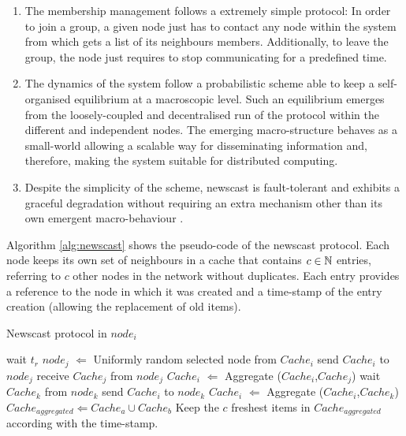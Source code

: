 \begin{enumerate}
\item The membership management follows a extremely simple protocol: In
      order to join a group, a given node just has to contact any node
      within the system from which gets a list of its neighbours
      members. Additionally, to leave the group, the node just requires
      to stop communicating for a predefined time.

\item The dynamics of the system follow a probabilistic scheme able to keep a self-organised equilibrium at a macroscopic level. Such an equilibrium emerges from the loosely-coupled and decentralised run of the protocol within the different and independent nodes. The emerging macro-structure behaves as a small-world \cite{wattsstrogatz} allowing a scalable way for disseminating information and, therefore, making the system suitable for distributed computing.

\item Despite the simplicity of the scheme, newscast is fault-tolerant and exhibits a graceful degradation without requiring an extra mechanism other than its own emergent macro-behaviour \cite{spyros:robustscalable}.
\end{enumerate}



Algorithm \ref{alg:newscast} shows the pseudo-code of the newscast protocol. Each node 
keeps its own set of neighbours in a cache that contains $c \in \mathbb{N}$ entries, referring to $c$ other nodes in the network without duplicates. Each entry provides a reference to the node in which it was created and a time-stamp of the entry creation (allowing the replacement of old items).



\begin{algorithm}
\caption{Newscast protocol in $node_i$}
\label{alg:newscast}
\scriptsize
\begin{algorithmic}


\LOOP 
\STATE wait $t_r$
\STATE $node_j$ $\Leftarrow$ Uniformly random selected node from $Cache_i$
\STATE send $Cache_i$ to $node_j$
\STATE receive $Cache_j$ from $node_j$
\STATE $Cache_i$ $\Leftarrow$ Aggregate ($Cache_i$,$Cache_j$)
\ENDLOOP
\STATE
{}
\LOOP
\STATE wait $Cache_k$ from $node_k$
\STATE send $Cache_i$ to $node_k$
\STATE $Cache_i$ $\Leftarrow$ Aggregate ($Cache_i$,$Cache_k$)
\ENDLOOP
\STATE
{}
\STATE $Cache_{aggregated} \Leftarrow Cache_a \cup Cache_b$
\STATE Keep the $c$ freshest items in $Cache_{aggregated}$ according with the time-stamp.
\end{algorithmic}
\end{algorithm}


